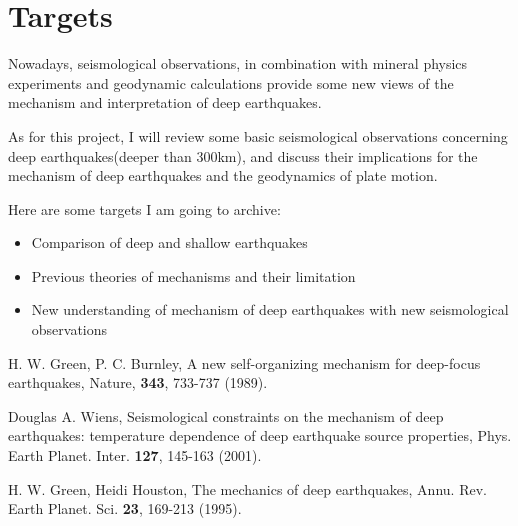 \documentclass[12pt]{article}
\begin{document}
\section{Targets}

Nowadays, seismological observations, in combination with mineral
physics experiments and geodynamic calculations provide some new views of
the mechanism and interpretation of deep earthquakes.

As for this project, I will review some basic seismological observations
concerning deep earthquakes(deeper than 300km), and discuss their
implications for the mechanism of deep earthquakes and the geodynamics of plate motion.

Here are some targets I am going to archive:
\begin{itemize}
\item Comparison of deep and shallow earthquakes
\item Previous theories of mechanisms and their limitation
\item New understanding of mechanism of deep earthquakes with new seismological observations
\end{itemize}




\begin{thebibliography}{99}

 H. W. Green, P. C. Burnley,
{A new self-organizing mechanism for deep-focus earthquakes},
Nature, {\bf 343}, 733-737 (1989).

 Douglas A. Wiens,
{Seismological constraints on the mechanism of deep earthquakes:
temperature dependence of deep earthquake source properties},
Phys. Earth Planet. Inter. {\bf 127}, 145-163 (2001).

 H. W. Green, Heidi Houston,
{The mechanics of deep earthquakes},
Annu. Rev. Earth Planet. Sci. {\bf 23}, 169-213 (1995).


\end{thebibliography}
\end{document}
